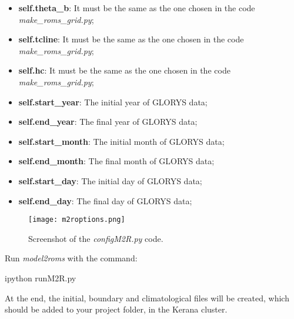 \begin{itemize}
    \item \textbf{self.theta\_b}: It must be the same as the one chosen in the code \textit{make\_roms\_grid.py};
    \item \textbf{self.tcline}: It must be the same as the one chosen in the code \textit{make\_roms\_grid.py};   
    \item \textbf{self.hc}: It must be the same as the one chosen in the code \textit{make\_roms\_grid.py};
    \item \textbf{self.start\_year}: The initial year of GLORYS data;
    \item \textbf{self.end\_year}: The final year of GLORYS data;
    \item \textbf{self.start\_month}: The initial month of GLORYS data;
    \item \textbf{self.end\_month}: The final month of GLORYS data;
    \item \textbf{self.start\_day}: The initial day of GLORYS data;
    \item \textbf{self.end\_day}: The final day of GLORYS data;
\end{itemize}
\bigskip

\begin{figure}[H]
    \centering
    \texttt{[image: m2roptions.png]}
    \caption{Screenshot of the \textit{configM2R.py} code.}
    \label{m2roptions}
\end{figure}
\bigskip

\noindent Run \textit{model2roms} with the command:
\bigskip

\begin{bashcode}
ipython runM2R.py
\end{bashcode}
\bigskip

\noindent At the end, the initial, boundary and climatological files will be created, which should be added to your project folder, in the Kerana cluster.
\bigskip
   
